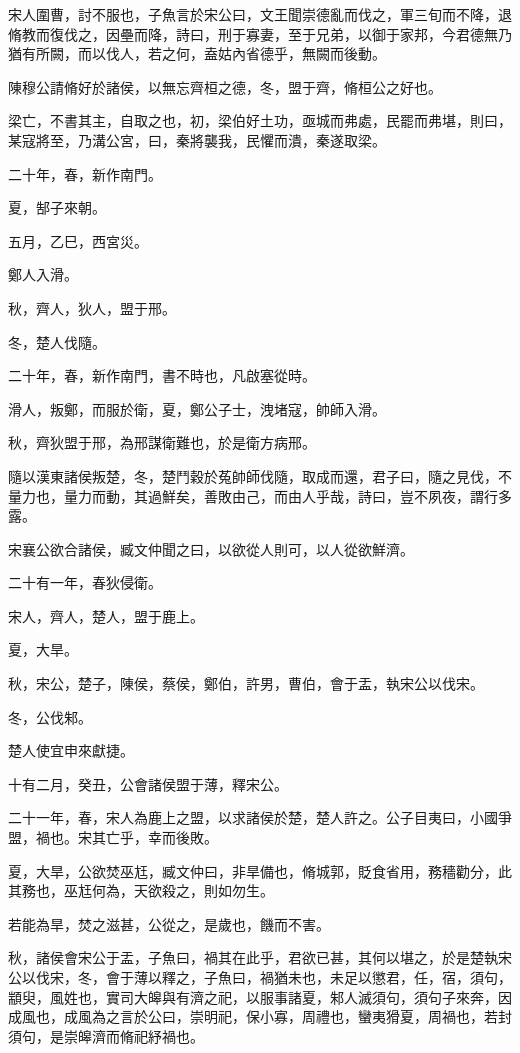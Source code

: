 \begin{pinyinscope}
宋人圍曹，討不服也，子魚言於宋公曰，文王聞崇德亂而伐之，軍三旬而不降，退脩教而復伐之，因壘而降，詩曰，刑于寡妻，至于兄弟，以御于家邦，今君德無乃猶有所闕，而以伐人，若之何，盍姑內省德乎，無闕而後動。

陳穆公請脩好於諸侯，以無忘齊桓之德，冬，盟于齊，脩桓公之好也。

梁亡，不書其主，自取之也，初，梁伯好土功，亟城而弗處，民罷而弗堪，則曰，某寇將至，乃溝公宮，曰，秦將襲我，民懼而潰，秦遂取梁。

二十年，春，新作南門。

夏，郜子來朝。

五月，乙巳，西宮災。

鄭人入滑。

秋，齊人，狄人，盟于邢。

冬，楚人伐隨。

二十年，春，新作南門，書不時也，凡啟塞從時。

滑人，叛鄭，而服於衛，夏，鄭公子士，洩堵寇，帥師入滑。

秋，齊狄盟于邢，為邢謀衛難也，於是衛方病邢。

隨以漢東諸侯叛楚，冬，楚鬥穀於菟帥師伐隨，取成而還，君子曰，隨之見伐，不量力也，量力而動，其過鮮矣，善敗由己，而由人乎哉，詩曰，豈不夙夜，謂行多露。

宋襄公欲合諸侯，臧文仲聞之曰，以欲從人則可，以人從欲鮮濟。

二十有一年，春狄侵衛。

宋人，齊人，楚人，盟于鹿上。

夏，大旱。

秋，宋公，楚子，陳侯，蔡侯，鄭伯，許男，曹伯，會于盂，執宋公以伐宋。

冬，公伐邾。

楚人使宜申來獻捷。

十有二月，癸丑，公會諸侯盟于薄，釋宋公。

二十一年，春，宋人為鹿上之盟，以求諸侯於楚，楚人許之。公子目夷曰，小國爭盟，禍也。宋其亡乎，幸而後敗。

夏，大旱，公欲焚巫尪，臧文仲曰，非旱備也，脩城郭，貶食省用，務穡勸分，此其務也，巫尪何為，天欲殺之，則如勿生。

若能為旱，焚之滋甚，公從之，是歲也，饑而不害。

秋，諸侯會宋公于盂，子魚曰，禍其在此乎，君欲已甚，其何以堪之，於是楚執宋公以伐宋，冬，會于薄以釋之，子魚曰，禍猶未也，未足以懲君，任，宿，須句，顓臾，風姓也，實司大皞與有濟之祀，以服事諸夏，邾人滅須句，須句子來奔，因成風也，成風為之言於公曰，崇明祀，保小寡，周禮也，蠻夷猾夏，周禍也，若封須句，是崇皞濟而脩祀紓禍也。


\end{pinyinscope}
